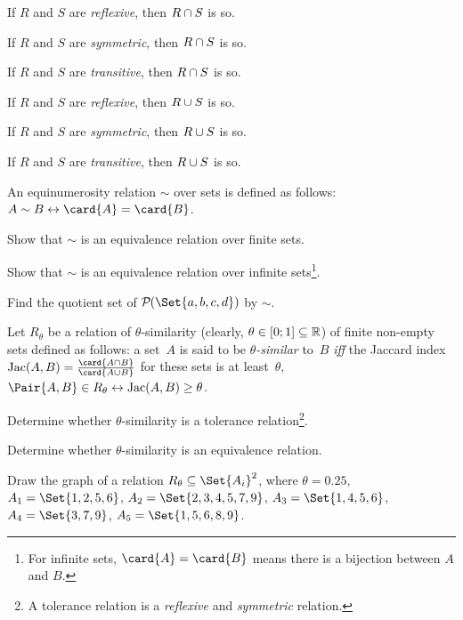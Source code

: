 \documentclass[a4paper,12pt]{article}
\newcommand{\Jac}{%
    \mathrm{Jac}}
\begin{document}
\begin{tasks}
    \begin{multicols}{2}
    \begin{subtasks}
        \item If $R$ and $S$ are \textit{reflexive}, then $R \cap S$ is so.
        \item If $R$ and $S$ are \textit{symmetric}, then $R \cap S$ is so.
        \item If $R$ and $S$ are \textit{transitive}, then $R \cap S$ is so.
        \item If $R$ and $S$ are \textit{reflexive}, then $R \cup S$ is so.
        \item If $R$ and $S$ are \textit{symmetric}, then $R \cup S$ is so.
        \item If $R$ and $S$ are \textit{transitive}, then $R \cup S$ is so.
    \end{subtasks}
    \end{multicols}


    \item An equinumerosity relation $\sim$ over sets is defined as follows: $A \sim B \iff \card{A} =\nobreak \card{B}$.

    \begin{subtasks}
        \item Show that $\sim$ is an equivalence relation over finite sets.
        \item Show that $\sim$ is an equivalence relation over infinite sets\footnote{For infinite sets, $\card{A} = \card{B}$ means there is a bijection between $A$ and $B$.}.
        \item Find the quotient set of $\powerset{\Set{a,b,c,d}}$ by $\sim$.
    \end{subtasks}


    \item Let $R_{\theta}$ be a relation of $\theta$-similarity (clearly, $\theta \in [0; 1] \subseteq \mathbb{R}$) of finite non-empty sets defined as follows: a set~$A$ is said to be \textit{$\theta$-similar} to~$B$ \textit{iff} the Jaccard index $\Jac(A,B) = \frac{\card{A \intersection B}}{\card{A \union B}}$ for these sets is at least~$\theta$, \ie $\Pair{A, B} \in R_{\theta} \iff \Jac(A,B) \geq \theta$.

    \begin{subtasks}
        \item Determine whether $\theta$-similarity is a tolerance relation\footnote{A tolerance relation is a \textit{reflexive} and \textit{symmetric} relation.}.
        \item Determine whether $\theta$-similarity is an equivalence relation.
        \item Draw the graph of a relation $R_{\theta} \subseteq \Set{A_i}^2$, where $\theta = 0.25$, $A_1 = \Set{1,2,5,6}$, $A_2 = \Set{2,3,4,5,7,9}$, $A_3 = \Set{1,4,5,6}$, $A_4 = \Set{3,7,9}$, $A_5 = \Set{1,5,6,8,9}$.
    \end{subtasks}



\end{tasks}
\end{document}
